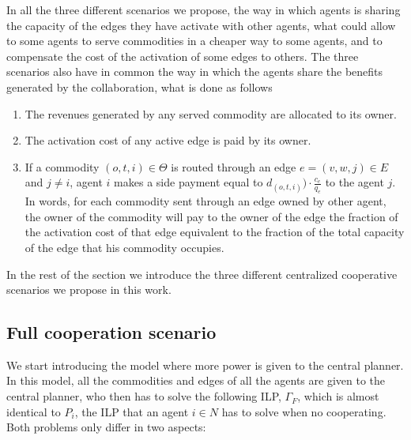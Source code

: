\documentclass[review]{elsarticle}
\begin{document}
In all the three different scenarios we propose, the way in which agents is sharing the capacity of the edges they have activate with other agents, what could allow to some agents to serve commodities in a cheaper way to some agents, and to compensate the cost of the activation of some edges to others. The three scenarios also have in common the way in which the agents share the benefits generated by the collaboration, what is done as follows
\begin{enumerate}
    \item The revenues generated by any served commodity are
    allocated to its owner.
    \item The activation cost of any active edge is paid by its owner.
    \item If a commodity $(o,t,i)\in \Theta$ is routed through an edge $e=(v,w,j)		\in E$ and $j\not = i$, agent $i$ makes a side payment equal to $d_{(o,t,i)})		\cdot\frac{c_e}{q_e}$ to the agent $j$. In words, for each commodity sent 		through an edge owned by other agent, the owner of the commodity will pay to 		the owner of the edge the fraction of the activation cost of that edge 			equivalent 	to the fraction of the total capacity of the edge that his 			commodity occupies.
\end{enumerate}

In the rest of the section we introduce the three different centralized
cooperative scenarios we propose in this work.


\subsection{Full cooperation scenario}

We start introducing the model where more power is given to the central planner.
In this model, all the commodities and edges of all the agents are given to the
central planner, who then has to solve the following ILP, $\Gamma_F$, which is almost identical to $P_ i$, the ILP that an
agent $i\in N$ has to solve when no cooperating. Both problems only differ in
two aspects:
\end{document}
